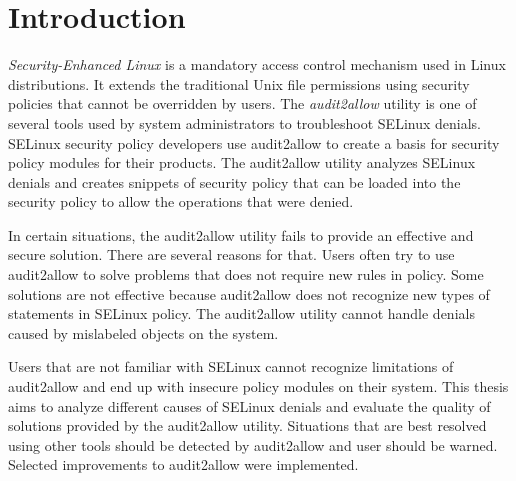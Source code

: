 \chapter{Introduction}

\emph{Security-Enhanced Linux} is a mandatory access control mechanism used in
Linux distributions. It extends the traditional Unix file permissions using
security policies that cannot be overridden by users. The \emph{audit2allow}
utility is one of several tools used by system administrators to troubleshoot
SELinux denials. SELinux security policy developers use audit2allow to create a
basis for security policy modules for their products.  The audit2allow utility
analyzes SELinux denials and creates snippets of security policy that can be
loaded into the security policy to allow the operations that were denied.

In certain situations, the audit2allow utility fails to provide an effective and
secure solution. There are several reasons for that. Users often try to use
audit2allow to solve problems that does not require new rules in policy. Some
solutions are not effective because audit2allow does not recognize new types of
statements in SELinux policy. The audit2allow utility cannot handle denials
caused by mislabeled objects on the system.

Users that are not familiar with SELinux cannot recognize limitations of
audit2allow and end up with insecure policy modules on their system.
This thesis aims to analyze different causes of SELinux denials and evaluate the
quality of solutions provided by the audit2allow utility. Situations that are
best resolved using other tools should be detected by audit2allow and user
should be warned. Selected improvements to audit2allow were implemented.

